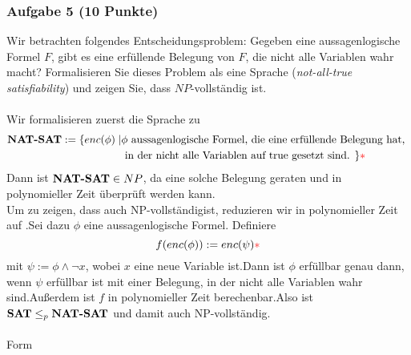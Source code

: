 \subsubsection*{Aufgabe 5 (10 Punkte)}
Wir betrachten folgendes Entscheidungsproblem: Gegeben eine aussagenlogische Formel $F$, gibt es eine erfüllende Belegung von $F$, die nicht alle Variablen wahr macht? Formalisieren Sie dieses Problem als eine Sprache  (\textit{not-all-true satisfiability}) und zeigen Sie, dass  $NP$-vollständig ist. \\\\
\LOES Wir formalisieren zuerst die Sprache zu 
\begin{align*}
\textbf{NAT-SAT} := \{enc(\phi) \mid & \phi \text{ aussagenlogische Formel, die eine erfüllende Belegung hat, } \\
& \text{ in der nicht alle Variablen auf true gesetzt sind. } \}{\textcolor{red}{* }}
\end{align*}
Dann ist $\textbf{NAT-SAT} \in NP$\POINT, da eine solche Belegung geraten und in polynomieller Zeit überprüft werden kann.\POINT \\
Um zu zeigen, dass  auch NP-vollständig\POINT ist, reduzieren wir in polynomieller Zeit  auf .\POINT Sei dazu $\phi$ eine aussagenlogische Formel. Definiere
\begin{equation*}
f(enc(\phi)) := enc(\psi){\textcolor{red}{* }}
\end{equation*}
 mit $\psi := \phi \land \neg x$, wobei $x$ eine neue Variable ist.\POINT Dann ist $\phi$ erfüllbar genau dann, wenn $\psi$ erfüllbar ist mit einer Belegung, in der nicht alle Variablen wahr sind.\POINT Außerdem ist $f$ in polynomieller Zeit berechenbar.\POINT Also ist $\textbf{SAT} \leq_p \textbf{NAT-SAT}$ und damit  auch NP-vollständig.\\\\
Form\POINT 

